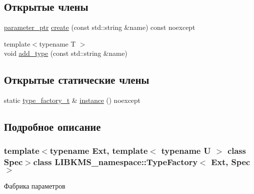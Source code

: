\subsection*{Открытые члены}
\begin{DoxyCompactItemize}
\item 
\hyperlink{classLIBKMS__namespace_1_1TypeFactory_a54c61c4d970a37a1059746070a1eea11}{parameter\-\_\-ptr} \hyperlink{classLIBKMS__namespace_1_1TypeFactory_a5105b6ca3256a95cebe301c14e8f56dc}{create} (const std\-::string \&name) const noexcept
\item 
{\footnotesize template$<$typename T $>$ }\\void \hyperlink{classLIBKMS__namespace_1_1TypeFactory_ac4c8b3e60558d8402e8a405cab8c1079}{add\-\_\-type} (const std\-::string \&name)
\end{DoxyCompactItemize}
\subsection*{Открытые статические члены}
\begin{DoxyCompactItemize}
\item 
static \hyperlink{classLIBKMS__namespace_1_1TypeFactory_a1ea3eb75810d29bed5a7f017e188a43d}{type\-\_\-factory\-\_\-t} \& \hyperlink{classLIBKMS__namespace_1_1TypeFactory_a14d95fd9ad1442a0c10120519f9841d7}{instance} () noexcept
\end{DoxyCompactItemize}


\subsection{Подробное описание}
\subsubsection*{template$<$typename Ext, template$<$ typename U $>$ class Spec$>$class L\-I\-B\-K\-M\-S\-\_\-namespace\-::\-Type\-Factory$<$ Ext, Spec $>$}

Фабрика параметров 

